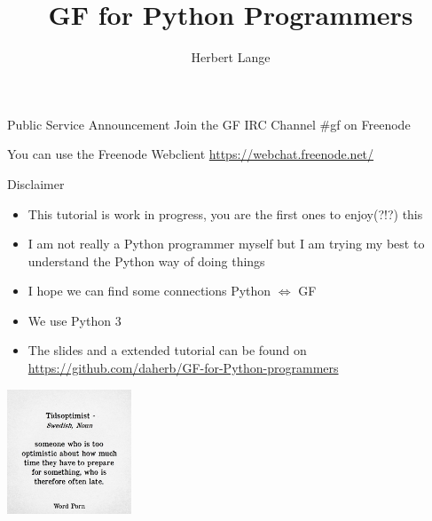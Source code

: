 \documentclass{beamer}
\title{GF for Python Programmers}
\author{Herbert Lange}
\begin{document}
\begin{frame}
  \maketitle
\end{frame}
\begin{frame}[fragile]{Public Service Announcement}
  Join the GF IRC Channel \#gf on Freenode

  You can use the Freenode Webclient
  \url{https://webchat.freenode.net/}
\end{frame}
\begin{frame}{Disclaimer}
  \begin{itemize}
  \item This tutorial is work in progress, you are the first ones to enjoy(?!?) this
  \item I am not really a Python programmer myself but I am trying my best to understand the Python way of doing things
  \item I hope we can find some connections Python $\Leftrightarrow$ GF
  \item We use Python 3
  \item The slides and a extended tutorial can be found on \url{https://github.com/daherb/GF-for-Python-programmers}
  \end{itemize}
  \begin{center}
    \includegraphics[height=10em]{tidsoptimist}
  \end{center}
\end{frame}
\end{document}
